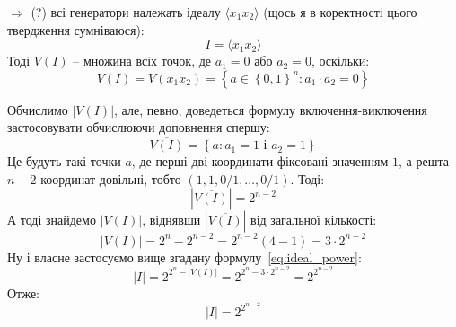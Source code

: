 $\Rightarrow$ (?) всі генератори належать ідеалу $\langle x_1 x_2 \rangle$ (щось я в коректності цього твердження 
сумніваюся):
\begin{equation*}
    I = \langle x_1 x_2 \rangle
\end{equation*}
Тоді $V(I)$ -- множина всіх точок, де $a_1 = 0$ або $a_2 = 0$, оскільки:
\begin{equation*}
    V(I) = V(x_1 x_2) = \left\{a \in \left\{0,1\right\}^n : a_1 \cdot a_2 = 0\right\}
\end{equation*}

Обчислимо $|V(I)|$, але, певно, доведеться формулу включення-виключення застосовувати обчислюючи доповнення спершу:
\begin{equation*}
    \overline{V(I)} = \left\{a : a_1 = 1 \text{ і } a_2 = 1\right\}
\end{equation*}
Це будуть такі точки $a$, де перші дві координати фіксовані значенням $1$, а решта $n - 2$ координат довільні, 
тобто $(1, 1, 0/1, \ldots, 0/1)$. Тоді:
\begin{equation*}
    |\overline{V(I)}| = 2^{n-2}
\end{equation*}
А тоді знайдемо $|V(I)|$, віднявши $|\overline{V(I)}|$ від загальної кількості:
\begin{equation*}
    |V(I)| = 2^n - 2^{n-2} = 2^{n-2}(4 - 1) = 3 \cdot 2^{n-2}
\end{equation*}
Ну і власне застосуємо вище згадану формулу~\eqref{eq:ideal_power}:
\begin{equation*}
    |I| = 2^{2^n - |V(I)|} = 2^{2^n - 3 \cdot 2^{n-2}} = 2^{2^{n-2}}
\end{equation*}
Отже:
\begin{equation*}
    |I| = 2^{2^{n-2}}
\end{equation*}